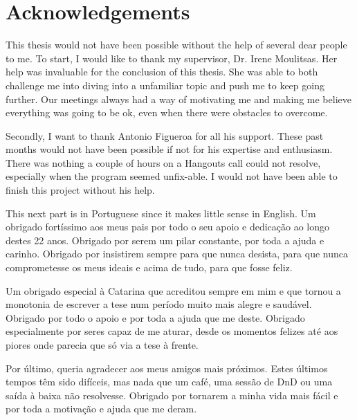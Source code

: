 \documentclass[12pt, openany]{book}
\begin{document}
\begin{listofabbreviations}
    
\end{listofabbreviations}

\chapter{Acknowledgements}
This thesis would not have been possible without the help of several dear people to me. To start, I would like to thank my supervisor, Dr. Irene Moulitsas. Her help was invaluable for the conclusion of this thesis. She was able to both challenge me into diving into a unfamiliar topic and push me to keep going further. Our meetings always had a way of motivating me and making me believe everything was going to be ok, even when there were obstacles to overcome. \par
Secondly, I want to thank Antonio Figueroa for all his support. These past months would not have been possible if not for his expertise and enthusiasm. There was nothing a couple of hours on a Hangouts call could not resolve, especially when the program seemed unfix-able. I would not have been able to finish this project without his help. \par
This next part is in Portuguese since it makes little sense in English. Um obrigado fortíssimo aos meus pais por todo o seu apoio e dedicação ao longo destes 22 anos. Obrigado por serem um pilar constante, por toda a ajuda e carinho. Obrigado por insistirem sempre para que nunca desista, para que nunca comprometesse os meus ideais e acima de tudo, para que fosse feliz. \par
Um obrigado especial à Catarina que acreditou sempre em mim e que tornou a monotonia de escrever a tese num período muito mais alegre e saudável. Obrigado por todo o apoio e por toda a ajuda que me deste. Obrigado especialmente por seres capaz de me aturar, desde os momentos felizes até aos piores onde parecia que só via a tese à frente.\par
Por último, queria agradecer aos meus amigos mais próximos. Estes últimos tempos têm sido difíceis, mas nada que um café, uma sessão de DnD ou uma saída à baixa não resolvesse. Obrigado por tornarem a minha vida mais fácil e por toda a motivação e ajuda que me deram.
\end{document}
